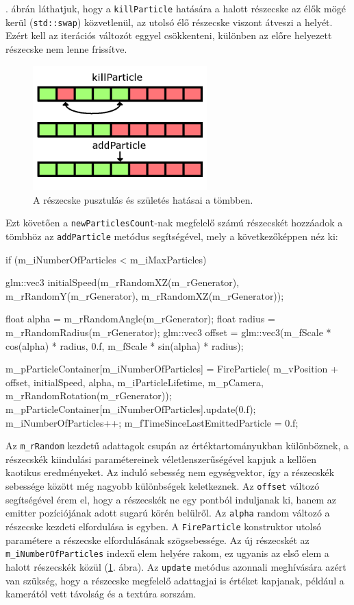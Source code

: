 . ábrán láthatjuk, hogy a \texttt{killParticle} hatására a halott részecske az élők mögé kerül (\texttt{std::swap}) közvetlenül, az utolsó élő részecske viszont átveszi a helyét. Ezért kell az iterációs változót eggyel csökkenteni, különben az előre helyezett részecske nem lenne frissítve.
\begin{figure}[h]
 \centering
 \includegraphics[width=0.6\textwidth]{kepek/particleArray.png}
 \caption{A részecske pusztulás és születés hatásai a tömbben.}
 \label{fig:particleArray}
\end{figure}

Ezt követően a \texttt{newParticlesCount}-nak megfelelő számú részecskét hozzáadok a tömbhöz az \texttt{addParticle} metódus segítségével, mely a következőképpen néz ki:
\begin{cpp}
if (m_iNumberOfParticles < m_iMaxParticles) {
glm::vec3 initialSpeed(m_rRandomXZ(m_rGenerator), 
	m_rRandomY(m_rGenerator), m_rRandomXZ(m_rGenerator));

float alpha = m_rRandomAngle(m_rGenerator);
float radius = m_rRandomRadius(m_rGenerator);
glm::vec3 offset = glm::vec3(m_fScale * cos(alpha) * radius, 
	0.f, m_fScale * sin(alpha) * radius);
		
m_pParticleContainer[m_iNumberOfParticles] = FireParticle(
	m_vPosition + offset, initialSpeed, alpha, m_iParticleLifetime, 
	m_pCamera, m_rRandomRotation(m_rGenerator));
m_pParticleContainer[m_iNumberOfParticles].update(0.f);
m_iNumberOfParticles++;
m_fTimeSinceLastEmittedParticle = 0.f;
}
\end{cpp}
Az \texttt{m\_rRandom} kezdetű adattagok csupán az értéktartományukban különböznek, a részecskék kiindulási paramétereinek véletlenszerűségével kapjuk a kellően kaotikus eredményeket. Az induló sebesség nem egységvektor, így a részecskék sebessége között még nagyobb különbségek keletkeznek. Az \texttt{offset} változó segítségével érem el, hogy a részecskék ne egy pontból induljanak ki, hanem az emitter pozíciójának adott sugarú körén belülről. Az \texttt{alpha} random változó a részecske kezdeti elfordulása is egyben. A \texttt{FireParticle} konstruktor utolsó paramétere a részecske elfordulásának szögsebessége. Az új részecskét az \texttt{m\_iNumberOfParticles} indexű elem helyére rakom, ez ugyanis az első elem a halott részecskék közül (\ref{fig:particleArray}. ábra). Az \texttt{update} metódus azonnali meghívására azért van szükség, hogy a részecske megfelelő adattagjai is értéket kapjanak, például a kamerától vett távolság és a textúra sorszám.

